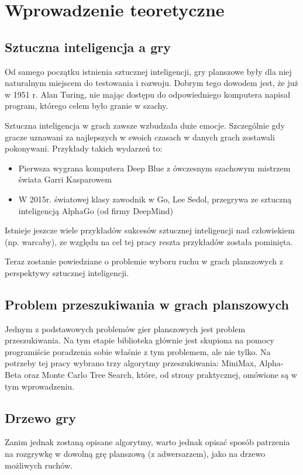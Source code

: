 \documentclass[polish,shortabstract,inz]{iithesis}
\begin{document}
\chapter{Wprowadzenie teoretyczne}
\section{Sztuczna inteligencja a gry}
Od samego początku istnienia sztucznej inteligencji, gry planszowe były dla niej naturalnym miejscem do testowania i rozwoju.
Dobrym tego dowodem jest, że już w 1951 r. Alan Turing, nie mając dostępu do odpowiedniego komputera napisał program, którego celem było granie w szachy.

Sztuczna inteligencja w grach zawsze wzbudzała duże emocje.
Szczególnie gdy gracze uznawani za najlepszych w swoich czasach w danych grach zostawali pokonywani.
Przykłady takich wydarzeń to:
\begin{itemize}
    \item Pierwsza wygrana komputera Deep Blue z ówczesnym szachowym mistrzem świata Garri Kasparowem
    \item W 2015r. światowej klasy zawodnik w Go, Lee Sedol, przegrywa ze sztuczną inteligencją AlphaGo (od firmy DeepMind)
\end{itemize}

Istnieje jeszcze wiele przykładów sukcesów sztucznej inteligencji nad człowiekiem (np. warcaby), ze względu na cel tej pracy reszta przykładów została pominięta.

Teraz zostanie powiedziane o problemie wyboru ruchu w grach planszowych z perspektywy sztucznej inteligencji.

\section{Problem przeszukiwania w grach planszowych}
Jednym z podstawowych problemów gier planszowych jest problem przeszukiwania.
Na tym etapie biblioteka głównie jest skupiona na pomocy programiście poradzenia sobie właśnie z tym problemem, ale nie tylko.
Na potrzeby tej pracy wybrano trzy algorytmy przeszukiwania: MiniMax, Alpha-Beta oraz Monte Carlo Tree Search, które, od strony praktycznej, omówione są w tym wprowadzeniu.

\section{Drzewo gry}
Zanim jednak zostaną opisane algorytmy, warto jednak opisać sposób patrzenia na rozgrywkę w dowolną grę planszową (z adwersarzem), jako na drzewo możliwych ruchów.
\end{document}
